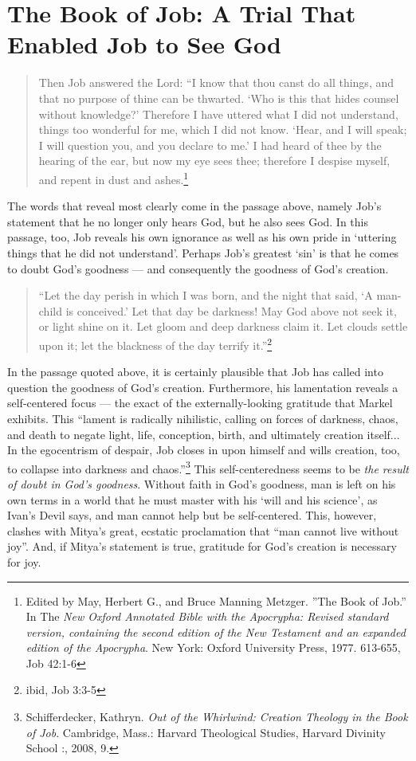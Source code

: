         \section{The Book of Job: A Trial That Enabled Job to See God}
        \begin{quote}
        \onehalfspacing
        Then Job answered the Lord: ``I know that thou canst do all things, and that no purpose of thine can be thwarted. `Who is this that hides counsel without knowledge?' Therefore I have uttered what I did not understand, things too wonderful for me, which I did not know. `Hear, and I will speak; I will question you, and you declare to me.' I had heard of thee by the hearing of the ear, but now my eye sees thee; therefore I despise myself, and repent in dust and ashes.\footnote{Edited by May, Herbert G., and Bruce Manning Metzger. ''The Book of Job.'' In The \emph{New Oxford Annotated Bible with the Apocrypha: Revised standard version, containing the second edition of the New Testament and an expanded edition of the Apocrypha}. New York: Oxford University Press, 1977. 613-655, Job 42:1-6} 
        \end{quote}
        The words that reveal most clearly come in the passage above, namely Job's statement that he no longer only hears God, but he also sees God. In this passage, too, Job reveals his own ignorance as well as his own pride in `uttering things that he did not understand'. Perhaps Job's greatest `sin' is that he comes to doubt God's goodness --- and consequently the goodness of God's creation. 
        
        \begin{quote}
        \onehalfspacing
        ``Let the day perish in which I was born, and the night that said, `A man-child is conceived.' Let that day be darkness! May God above not seek it, or light shine on it. Let gloom and deep darkness claim it. Let clouds settle upon it; let the blackness of the day terrify it.''\footnote{ibid, Job 3:3-5}
        \end{quote}
        
        In the passage quoted above, it is certainly plausible that Job has called into question the goodness of God's creation. Furthermore, his lamentation reveals a self-centered focus --- the exact of the externally-looking gratitude that Markel exhibits. This ``lament is radically nihilistic, calling on forces of darkness, chaos, and death to negate light, life, conception, birth, and ultimately creation itself... In the egocentrism of despair, Job closes in upon himself and wills creation, too, to collapse into darkness and chaos.''\footnote{Schifferdecker, Kathryn. \emph{Out of the Whirlwind: Creation Theology in the Book of Job}. Cambridge, Mass.: Harvard Theological Studies, Harvard Divinity School :, 2008, 9.} This self-centeredness seems to be \emph{the result of doubt in God's goodness}. Without faith in God's goodness, man is left on his own terms in a world that he must master with his `will and his science', as Ivan's Devil says, and man cannot help but be self-centered. This, however, clashes with Mitya's great, ecstatic proclamation that ``man cannot live without joy''. And, if Mitya's statement is true, gratitude for God's creation is necessary for joy.
        
